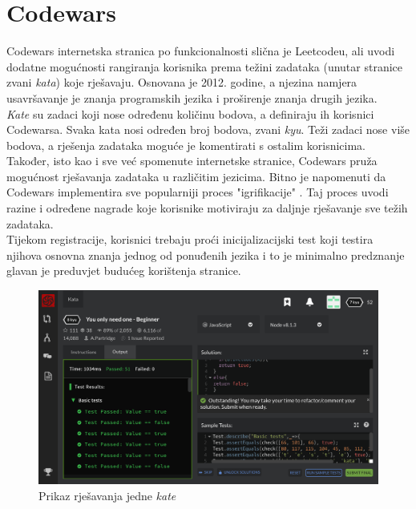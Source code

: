 \documentclass[times, utf8, zavrsni, numeric]{fer}
\begin{document}
		\section{Codewars}
		\label{sec:codewars}
		Codewars internetska stranica po funkcionalnosti slična je Leetcodeu, ali uvodi dodatne mogućnosti rangiranja korisnika prema težini zadataka  (unutar stranice zvani \textit{kata}) koje rješavaju. Osnovana je 2012. godine, a  njezina namjera usavršavanje je znanja programskih jezika i proširenje znanja drugih jezika.\\
		\textit{Kate} su zadaci koji nose određenu količinu bodova, a definiraju ih korisnici Codewarsa. Svaka kata nosi određen broj bodova, zvani \textit{kyu}. Teži zadaci nose više bodova, a rješenja zadataka moguće je komentirati s ostalim korisnicima. Također, isto kao i sve već spomenute internetske stranice, Codewars pruža mogućnost rješavanja zadataka u različitim jezicima. Bitno je napomenuti da Codewars implementira sve popularniji proces "igrifikacije" . Taj proces uvodi razine i određene nagrade koje korisnike motiviraju za daljnje rješavanje sve težih zadataka.\\
		Tijekom registracije, korisnici trebaju proći inicijalizacijski test koji testira njihova osnovna znanja jednog od ponuđenih jezika i to je minimalno predznanje glavan je preduvjet budućeg korištenja stranice.
		\begin{figure}[H]
			\centering
			\includegraphics[width=\linewidth]{pictures/prikazi/Codewars.png}
			\caption{Prikaz rješavanja jedne \textit{kate}}
			\label{fig:codewars}
		\end{figure}
	
\end{document}
